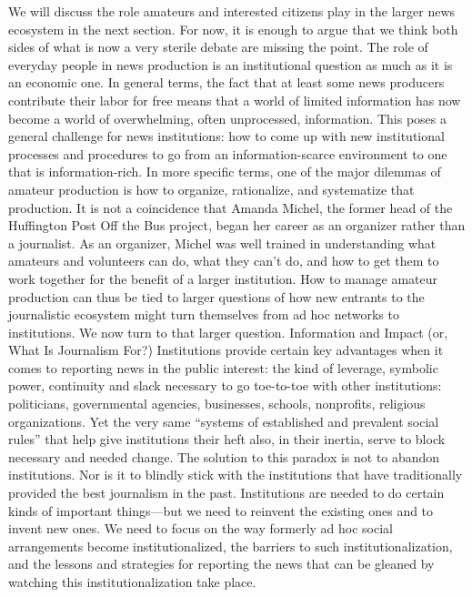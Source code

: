 We will discuss the role amateurs and interested citizens play in the larger news
ecosystem in the next section. For now, it is enough to argue that we think
both sides of what is now a very sterile debate are missing the point. The role of
everyday people in news production is an institutional question as much as it is
an economic one. In general terms, the fact that at least some news producers
contribute their labor for free means that a world of limited information has now
become a world of overwhelming, often unprocessed, information. This poses a
general challenge for news institutions: how to come up with new institutional
processes and procedures to go from an information-scarce environment to one
that is information-rich.
In more specific terms, one of the major dilemmas of amateur production is
how to organize, rationalize, and systematize that production. It is not a coincidence
that Amanda Michel, the former head of the Huffington Post Off the Bus
project, began her career as an organizer rather than a journalist. As an organizer,
Michel was well trained in understanding what amateurs and volunteers can do,
what they can’t do, and how to get them to work together for the benefit of a
larger institution. How to manage amateur production can thus be tied to larger
questions of how new entrants to the journalistic ecosystem might turn themselves
from ad hoc networks to institutions. We now turn to that larger question.
Information and Impact (or, What Is Journalism For?)
Institutions provide certain key advantages when it comes to reporting news in
the public interest: the kind of leverage, symbolic power, continuity and slack
necessary to go toe-to-toe with other institutions: politicians, governmental
agencies, businesses, schools, nonprofits, religious organizations. Yet the very same
``systems of established and prevalent social rules'' that help give institutions their
heft also, in their inertia, serve to block necessary and needed change.
The solution to this paradox is not to abandon institutions. Nor is it to blindly
stick with the institutions that have traditionally provided the best journalism in
the past. Institutions are needed to do certain kinds of important things—but we
need to reinvent the existing ones and to invent new ones. We need to focus on
the way formerly ad hoc social arrangements become institutionalized, the barriers
to such institutionalization, and the lessons and strategies for reporting the
news that can be gleaned by watching this institutionalization take place.

